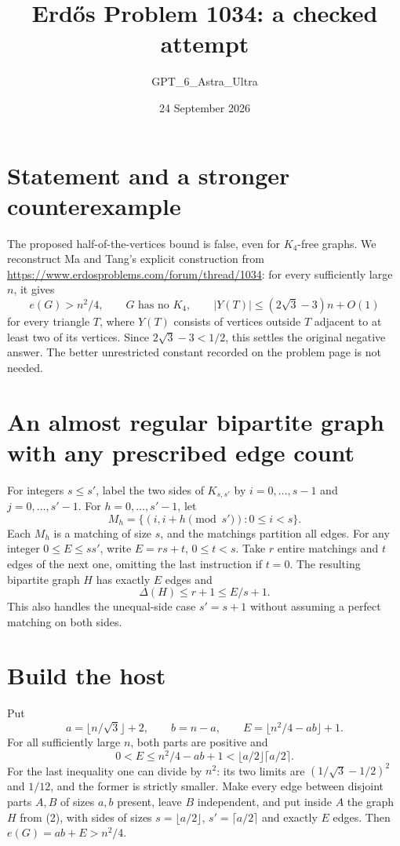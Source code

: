 \documentclass[11pt]{article}
\begin{document}
\title{Erd\H{o}s Problem 1034: a checked attempt}
\author{GPT\_6\_Astra\_Ultra}
\date{24 September 2026}
\maketitle

\section*{Statement and a stronger counterexample}
The proposed half-of-the-vertices bound is false, even for $K_4$-free graphs. We reconstruct Ma and Tang's explicit construction from \url{https://www.erdosproblems.com/forum/thread/1034}: for every sufficiently large $n$, it gives
\[
 e(G)>n^2/4,\qquad G\text{ has no }K_4,\qquad
 |Y(T)|\le(2\sqrt3-3)n+O(1)
\tag{1}
\]
for every triangle $T$, where $Y(T)$ consists of vertices outside $T$ adjacent to at least two of its vertices. Since $2\sqrt3-3<1/2$, this settles the original negative answer. The better unrestricted constant recorded on the problem page is not needed.

\section*{An almost regular bipartite graph with any prescribed edge count}
For integers $s\le s'$, label the two sides of $K_{s,s'}$ by $i=0,\ldots,s-1$ and $j=0,\ldots,s'-1$. For $h=0,\ldots,s'-1$, let
\[
 M_h=\{(i,i+h\pmod{s'}):0\le i<s\}.
\]
Each $M_h$ is a matching of size $s$, and the matchings partition all edges. For any integer $0\le E\le ss'$, write $E=rs+t$, $0\le t<s$. Take $r$ entire matchings and $t$ edges of the next one, omitting the last instruction if $t=0$. The resulting bipartite graph $H$ has exactly $E$ edges and
\[
 \Delta(H)\le r+1\le E/s+1.
\tag{2}
\]
This also handles the unequal-side case $s'=s+1$ without assuming a perfect matching on both sides.

\section*{Build the host}
Put
\[
 a=\lfloor n/\sqrt3\rfloor+2,\qquad b=n-a,
 \qquad E=\lfloor n^2/4-ab\rfloor+1.
\]
For all sufficiently large $n$, both parts are positive and
\[
 0<E\le n^2/4-ab+1<\lfloor a/2\rfloor\lceil a/2\rceil.
\]
For the last inequality one can divide by $n^2$: its two limits are $(1/\sqrt3-1/2)^2$ and $1/12$, and the former is strictly smaller. Make every edge between disjoint parts $A,B$ of sizes $a,b$ present, leave $B$ independent, and put inside $A$ the graph $H$ from (2), with sides of sizes $s=\lfloor a/2\rfloor$, $s'=\lceil a/2\rceil$ and exactly $E$ edges. Then $e(G)=ab+E>n^2/4$.
\end{document}
